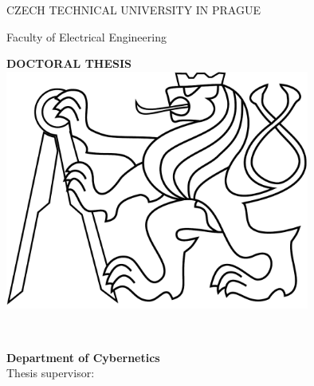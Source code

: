 \begin{titlepage}
\begin{center}

{\Large CZECH TECHNICAL UNIVERSITY IN PRAGUE}
\vskip 10pt

\vskip 8pt
{\Large Faculty of Electrical Engineering}
 
\vspace{50pt}
{\Huge\bf DOCTORAL THESIS}\\
\vspace{40pt}
\includegraphics[width=10cm]{fig/lev.pdf}

\vspace{40pt}
{\Large\rm \Author } \\
\vspace{20pt}
{\Large\bf \Title}

\vspace{60pt}
{\bf Department of Cybernetics}\\
\vspace{5pt}   
{Thesis supervisor: {\bf \Supervisor}}

\vspace{30pt}
\end{center}
\end{titlepage}
